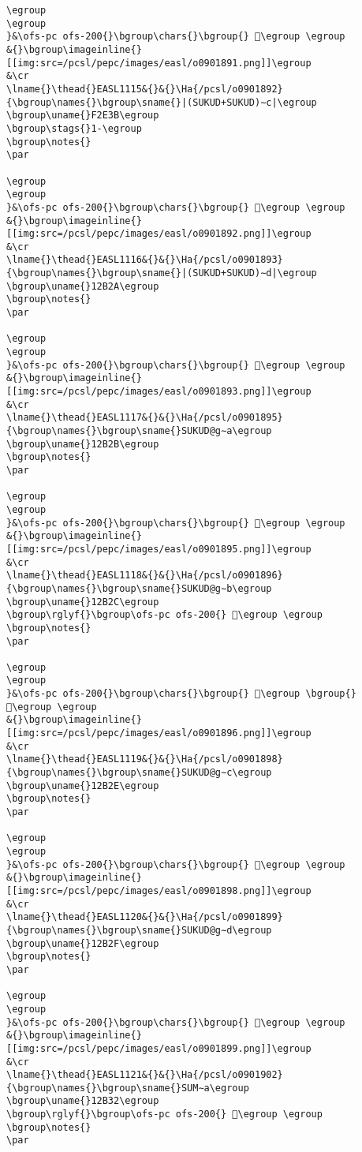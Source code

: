 \begin{verbatim}
\egroup
\egroup
}&\ofs-pc ofs-200{}\bgroup\chars{}\bgroup{} 𒬩\egroup \egroup
&{}\bgroup\imageinline{}[[img:src=/pcsl/pepc/images/easl/o0901891.png]]\egroup
&\cr
\lname{}\thead{}EASL1115&{}&{}\Ha{/pcsl/o0901892}{\bgroup\names{}\bgroup\sname{}|(SUKUD+SUKUD)∼c|\egroup
\bgroup\uname{}F2E3B\egroup
\bgroup\stags{}1-\egroup
\bgroup\notes{}
\par 

\egroup
\egroup
}&\ofs-pc ofs-200{}\bgroup\chars{}\bgroup{} 󲸻\egroup \egroup
&{}\bgroup\imageinline{}[[img:src=/pcsl/pepc/images/easl/o0901892.png]]\egroup
&\cr
\lname{}\thead{}EASL1116&{}&{}\Ha{/pcsl/o0901893}{\bgroup\names{}\bgroup\sname{}|(SUKUD+SUKUD)∼d|\egroup
\bgroup\uname{}12B2A\egroup
\bgroup\notes{}
\par 

\egroup
\egroup
}&\ofs-pc ofs-200{}\bgroup\chars{}\bgroup{} 𒬪\egroup \egroup
&{}\bgroup\imageinline{}[[img:src=/pcsl/pepc/images/easl/o0901893.png]]\egroup
&\cr
\lname{}\thead{}EASL1117&{}&{}\Ha{/pcsl/o0901895}{\bgroup\names{}\bgroup\sname{}SUKUD@g∼a\egroup
\bgroup\uname{}12B2B\egroup
\bgroup\notes{}
\par 

\egroup
\egroup
}&\ofs-pc ofs-200{}\bgroup\chars{}\bgroup{} 𒬫\egroup \egroup
&{}\bgroup\imageinline{}[[img:src=/pcsl/pepc/images/easl/o0901895.png]]\egroup
&\cr
\lname{}\thead{}EASL1118&{}&{}\Ha{/pcsl/o0901896}{\bgroup\names{}\bgroup\sname{}SUKUD@g∼b\egroup
\bgroup\uname{}12B2C\egroup
\bgroup\rglyf{}\bgroup\ofs-pc ofs-200{} 𒬬\egroup \egroup
\bgroup\notes{}
\par 

\egroup
\egroup
}&\ofs-pc ofs-200{}\bgroup\chars{}\bgroup{} 𒬬\egroup \bgroup{} 𒬭\egroup \egroup
&{}\bgroup\imageinline{}[[img:src=/pcsl/pepc/images/easl/o0901896.png]]\egroup
&\cr
\lname{}\thead{}EASL1119&{}&{}\Ha{/pcsl/o0901898}{\bgroup\names{}\bgroup\sname{}SUKUD@g∼c\egroup
\bgroup\uname{}12B2E\egroup
\bgroup\notes{}
\par 

\egroup
\egroup
}&\ofs-pc ofs-200{}\bgroup\chars{}\bgroup{} 𒬮\egroup \egroup
&{}\bgroup\imageinline{}[[img:src=/pcsl/pepc/images/easl/o0901898.png]]\egroup
&\cr
\lname{}\thead{}EASL1120&{}&{}\Ha{/pcsl/o0901899}{\bgroup\names{}\bgroup\sname{}SUKUD@g∼d\egroup
\bgroup\uname{}12B2F\egroup
\bgroup\notes{}
\par 

\egroup
\egroup
}&\ofs-pc ofs-200{}\bgroup\chars{}\bgroup{} 𒬯\egroup \egroup
&{}\bgroup\imageinline{}[[img:src=/pcsl/pepc/images/easl/o0901899.png]]\egroup
&\cr
\lname{}\thead{}EASL1121&{}&{}\Ha{/pcsl/o0901902}{\bgroup\names{}\bgroup\sname{}SUM∼a\egroup
\bgroup\uname{}12B32\egroup
\bgroup\rglyf{}\bgroup\ofs-pc ofs-200{} 𒬲\egroup \egroup
\bgroup\notes{}
\par 


\end{verbatim}
